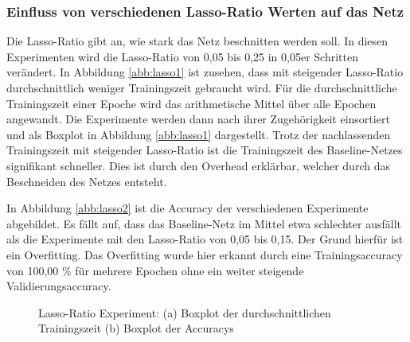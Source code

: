 \subsubsection{Einfluss von verschiedenen Lasso-Ratio Werten auf das Netz}
\color{vermi}
Die Lasso-Ratio gibt an, wie stark das Netz beschnitten werden soll. In diesen Experimenten wird die Lasso-Ratio von 0,05 bis 0,25 in 0,05er Schritten verändert. In Abbildung \ref{abb:lasso1} ist zusehen, dass mit steigender Lasso-Ratio durchschnittlich weniger Trainingszeit gebraucht wird. Für die durchschnittliche Trainingszeit einer Epoche wird das arithmetische Mittel über alle Epochen angewandt. Die Experimente werden dann nach ihrer Zugehörigkeit einsortiert und als Boxplot in Abbildung \ref{abb:lasso1} dargestellt. Trotz der nachlassenden Trainingszeit mit steigender Lasso-Ratio ist die Trainingszeit des Baseline-Netzes signifikant schneller. Dies ist durch den Overhead erklärbar, welcher durch das Beschneiden des Netzes entsteht.


In Abbildung \ref{abb:lasso2} ist die Accuracy der verschiedenen Experimente abgebildet. Es fällt auf, dass das Baseline-Netz im Mittel etwa schlechter ausfällt als die Experimente mit den Lasso-Ratio von 0,05 bis 0,15. Der Grund hierfür ist ein Overfitting. Das Overfitting wurde hier erkannt durch eine Trainingsaccuracy von 100,00 \% für mehrere Epochen ohne ein weiter steigende Validierungsaccuracy. 
\begin{figure}
     \centering
     \hfill
     \caption{Lasso-Ratio Experiment: (a) Boxplot der durchschnittlichen Trainingszeit (b) Boxplot der Accuracys}
     \label{abb:lasso}
\end{figure}




